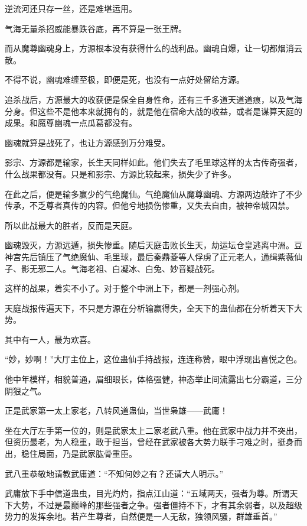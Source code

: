 \begin{this_body}
逆流河还只存一丝，还是难堪运用。

气海无量杀招威能暴跌谷底，再不算是一张王牌。

而从魔尊幽魂身上，方源根本没有获得什么的战利品。幽魂自爆，让一切都烟消云散。

不得不说，幽魂难缠至极，即便是死，也没有一点好处留给方源。

追杀战后，方源最大的收获便是保全自身性命，还有三千多道天道道痕，以及气海分身。但这些不是他本来就拥有的，就是他在宿命大战的收益，或者是谋算天庭的成果。和魔尊幽魂一点瓜葛都没有。

幽魂就算是战死了，也让方源感到万分难受。

影宗、方源都是输家，长生天同样如此。他们失去了毛里球这样的太古传奇强者，什么战果都没有。只是和影宗、方源比较起来，损失少了许多。

在此之后，便是输多赢少的气绝魔仙。气绝魔仙从魔尊幽魂、方源两边敲诈了不少传承，不乏尊者真传的内容。但他兮地损伤惨重，又失去自由，被神帝城囚禁。

所以此战最大的胜者，反而是天庭。

幽魂毁灭，方源远遁，损失惨重。随后天庭击败长生天，劫运坛仓皇逃离中洲。豆神宫先后镇压了气绝魔仙、毛里球，最后秦鼎菱等人俘虏了正元老人，通缉紫薇仙子、影无邪二人。气海老祖、白凝冰、白兔、妙音疑战死。

这样的战果，着实不小了。对于整个中洲上下，都是一剂强心剂。

天庭战报传遍天下，不只是方源在分析输赢得失，全天下的蛊仙都在分析着天下大势。

其中有一人，最为欢喜。

“妙，妙啊！”大厅主位上，这位蛊仙手持战报，连连称赞，眼中浮现出喜悦之色。

他中年模样，相貌普通，眉细眼长，体格强健，神态举止间流露出七分霸道，三分阴狠之气。

正是武家第一太上家老，八转风道蛊仙，当世枭雄——武庸！

坐在大厅左手第一位的，则是武家太上二家老武八重。他在武家中战力并不突出，但资历最老，为人稳重，敢于担当，曾经在武家被各大势力联手刁难之时，挺身而出，稳住局面，乃是武家肱骨重臣。

武八重恭敬地请教武庸道：“不知何妙之有？还请大人明示。”

武庸放下手中信道蛊虫，目光灼灼，指点江山道：“五域两天，强者为尊。所谓天下大势，不过是最巅峰的那些强者之争。强者僵持不下，才有其余弱者，以及超级势力的发挥余地。若产生尊者，自然便是一人无敌，独领风骚，群雄垂首。”


\end{this_body}
